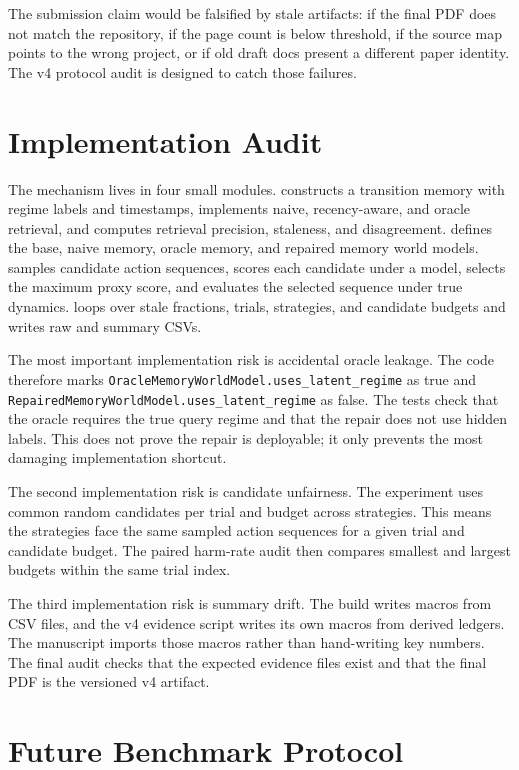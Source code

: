 \documentclass{article}
\begin{document}
The submission claim would be falsified by stale artifacts: if the final PDF
does not match the repository, if the page count is below threshold, if the
source map points to the wrong project, or if old draft docs present a
different paper identity. The v4 protocol audit is designed to catch those failures.

\section{Implementation Audit}
\label{app:implementation-audit}

The mechanism lives in four small modules.  constructs a
transition memory with regime labels and timestamps, implements naive,
recency-aware, and oracle retrieval, and computes retrieval precision,
staleness, and disagreement.  defines the base, naive memory,
oracle memory, and repaired memory world models.  samples
candidate action sequences, scores each candidate under a model, selects the
maximum proxy score, and evaluates the selected sequence under true dynamics.
 loops over stale fractions, trials, strategies, and
candidate budgets and writes raw and summary CSVs.

The most important implementation risk is accidental oracle leakage. The code
therefore marks \texttt{OracleMemoryWorldModel.uses\_latent\_regime} as true
and \texttt{RepairedMemoryWorldModel.uses\_latent\_regime} as false. The tests
check that the oracle requires the true query regime and that the repair does
not use hidden labels. This does not prove the repair is deployable; it only
prevents the most damaging implementation shortcut.

The second implementation risk is candidate unfairness. The experiment uses
common random candidates per trial and budget across strategies. This means
the strategies face the same sampled action sequences for a given trial and
candidate budget. The paired harm-rate audit then compares smallest and
largest budgets within the same trial index.

The third implementation risk is summary drift. The build writes macros from
CSV files, and the v4 evidence script writes its own macros from derived
ledgers. The manuscript imports those macros rather than hand-writing key
numbers. The final audit checks that the expected evidence files exist and
that the final PDF is the versioned v4 artifact.

\section{Future Benchmark Protocol}
\label{app:future-protocol}
\end{document}
